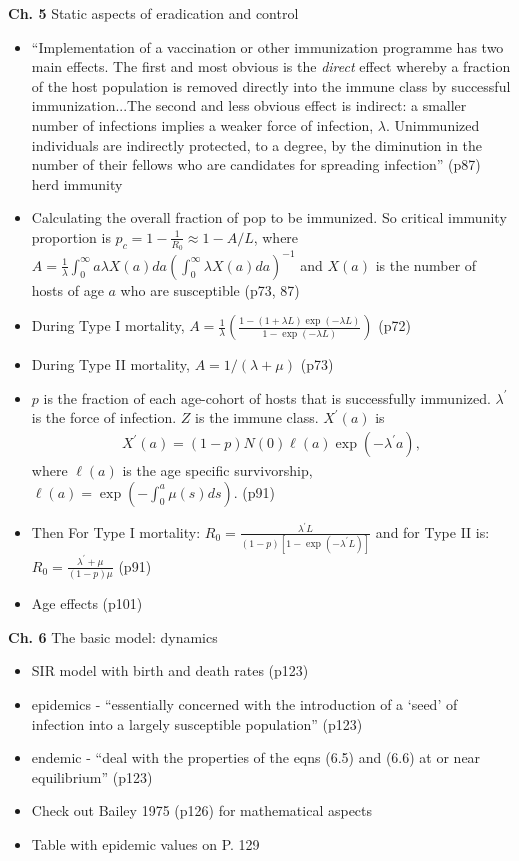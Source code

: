 \documentclass{article}
\begin{document}
\textbf{Ch. 5} Static aspects of eradication and control
\begin{itemize}
\item ``Implementation of a vaccination or other immunization programme has two main effects.  The first and most obvious is the \textit{direct} effect whereby a fraction of the host population is removed directly into the immune class by successful immunization...The second and less obvious effect is indirect:  a smaller number of infections implies a weaker force of infection, $\lambda$.  Unimmunized individuals are indirectly protected, to a degree, by the diminution in the number of their fellows who are candidates for spreading infection'' (p87) herd immunity
\item Calculating the overall fraction of pop to be immunized.  So critical immunity proportion is $p_c = 1 - \frac{1}{R_0} \approx 1 - A/L$, where $A = \frac{1}{\lambda} \int_0^\infty a \lambda X(a) da \left ( \int_0^\infty \lambda X(a)da\right )^{-1}$ and $X(a)$ is the number of hosts of age $a$ who are susceptible (p73, 87)
\item During Type I mortality, $A = \frac{1}{\lambda} \left (\frac{1 - (1 + \lambda L)\exp(- \lambda L)}{1 - \exp ( - \lambda L)} \right ) $ (p72)
\item During Type II mortality, $A = 1/ (\lambda + \mu)$ (p73)
\item $p$ is the fraction of each age-cohort of hosts that is successfully immunized.  $\lambda^\prime$ is the force of infection. $Z$ is the immune class.  $X^\prime(a)$ is
\begin{align*}
X^\prime(a) = (1-p)N(0)\ell (a) \exp ( - \lambda^\prime a),
\end{align*}
where $\ell (a)$ is the age specific survivorship, $\ell (a) = \exp \left ( - \int_0^a \mu (s) ds \right )$. (p91)
\item Then For Type I mortality: $R_0 = \frac{ \lambda^\prime L}{(1-p)[1 - \exp ( - \lambda^\prime L)]}$ and for Type II is:  $R_0 = \frac{\lambda^\prime + \mu}{(1-p) \mu}$ (p91)
\item Age effects (p101)

\end{itemize}

\textbf{Ch. 6} The basic model: dynamics

\begin{itemize}
\item SIR model with birth and death rates (p123)
\item epidemics - ``essentially concerned with the introduction of a `seed' of infection into a largely susceptible population'' (p123)
\item endemic - ``deal with the properties of the eqns (6.5) and (6.6) at or near equilibrium'' (p123)
\item Check out Bailey 1975 (p126) for mathematical aspects
\item Table with epidemic values on P. 129
\end{itemize}
\end{document}
